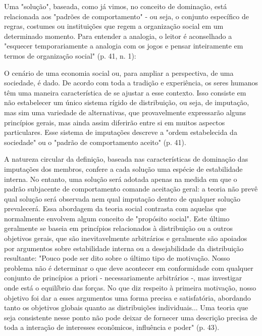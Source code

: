 \documentclass[a4paper,12pt]{article}[abntex2]
\begin{document}
Uma "solução", baseada, como já vimos, no conceito de dominação, está relacionada aos "padrões de comportamento" - ou seja, o conjunto específico de regras, costumes ou instituições que regem a organização social em um determinado momento. Para entender a analogia, o leitor é aconselhado a "esquecer temporariamente a analogia com os jogos e pensar inteiramente em termos de organização social" (p. 41, n. 1):

O cenário de uma economia social ou, para ampliar a perspectiva, de uma sociedade, é dado. De acordo com toda a tradição e experiência, os seres humanos têm uma maneira característica de se ajustar a esse contexto. Isso consiste em não estabelecer um único sistema rígido de distribuição, ou seja, de imputação, mas sim uma variedade de alternativas, que provavelmente expressarão alguns princípios gerais, mas ainda assim diferirão entre si em muitos aspectos particulares. Esse sistema de imputações descreve a "ordem estabelecida da sociedade" ou o "padrão de comportamento aceito" (p. 41).

A natureza circular da definição, baseada nas características de dominação das imputações dos membros, confere a cada solução uma espécie de estabilidade interna. No entanto, uma solução será adotada apenas na medida em que o padrão subjacente de comportamento comande aceitação geral: a teoria não prevê qual solução será observada nem qual imputação dentro de qualquer solução prevalecerá. Essa abordagem da teoria social contrasta com aquelas que normalmente envolvem algum conceito de "propósito social". Este último geralmente se baseia em princípios relacionados à distribuição ou a outros objetivos gerais, que são inevitavelmente arbitrários e geralmente são apoiados por argumentos sobre estabilidade interna ou a desejabilidade da distribuição resultante: "Pouco pode ser dito sobre o último tipo de motivação. Nosso problema não é determinar o que deve acontecer em conformidade com qualquer conjunto de princípios a priori - necessariamente arbitrários -, mas investigar onde está o equilíbrio das forças. No que diz respeito à primeira motivação, nosso objetivo foi dar a esses argumentos uma forma precisa e satisfatória, abordando tanto os objetivos globais quanto as distribuições individuais... Uma teoria que seja consistente nesse ponto não pode deixar de fornecer uma descrição precisa de toda a interação de interesses econômicos, influência e poder" (p. 43).
\end{document}
